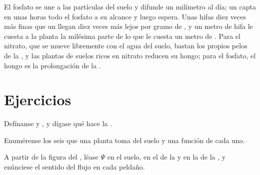 \begin{example}\label{ex:b1:plant-water-minerals:phosphate}
El fosfato se une a las partículas del suelo y difunde un milímetro al día;
un  capta en unas horas todo el fosfato a su alcance y luego
espera. Unas hifas diez veces más finas que un  llegan diez
veces más lejos por gramo de , y un metro de hifa le cuesta a la
planta la milésima parte de lo que le cuesta un metro de . Para el
nitrato, que se mueve libremente con el agua del suelo, bastan los propios
pelos de la , y las plantas de suelos ricos en nitrato reducen su hongo;
para el fosfato, el hongo es la prolongación de la .
\end{example}

\section{Ejercicios}

\begin{exercise}[$\star$]\label{exo:b1:plant-water-minerals:1}
Defínanse  y , y dígase qué hace la .
\end{exercise}

\begin{exercise}[$\star$]\label{exo:b1:plant-water-minerals:2}
Enumérense los seis  que una planta toma del suelo y una
función de cada uno.
\end{exercise}

\begin{exercise}[$\star$]\label{exo:b1:plant-water-minerals:3}
A partir de la figura del , léase $\Psi$ en el suelo, en el
 de la  y en la  de la , y enúnciese el sentido del
flujo en cada peldaño.
\end{exercise}


